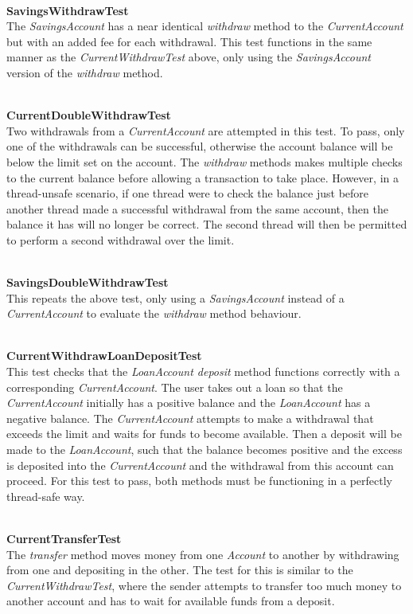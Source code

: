 \documentclass[a4paper,12pt]{article}
\begin{document}
\textbf{\\SavingsWithdrawTest}
\\The \textit{SavingsAccount} has a near identical \textit{withdraw} method to the \textit{CurrentAccount} but with an added fee for each withdrawal. This test functions in the same manner as the \textit{CurrentWithdrawTest} above, only using the \textit{SavingsAccount} version of the \textit{withdraw} method.

\textbf{\\CurrentDoubleWithdrawTest}
\\Two withdrawals from a \textit{CurrentAccount} are attempted in this test. To pass, only one of the withdrawals can be successful, otherwise the account balance will be below the limit set on the account. The \textit{withdraw} methods makes multiple checks to the current balance before allowing a transaction to take place. However, in a thread-unsafe scenario, if one thread were to check the balance just before another thread made a successful withdrawal from the same account, then the balance it has will no longer be correct. The second thread will then be permitted to perform a second withdrawal over the limit.    

\textbf{\\SavingsDoubleWithdrawTest}
\\This repeats the above test, only using a \textit{SavingsAccount} instead of a \textit{CurrentAccount} to evaluate the \textit{withdraw} method behaviour.

\textbf{\\CurrentWithdrawLoanDepositTest}
\\This test checks that the \textit{LoanAccount deposit} method functions correctly with a corresponding \textit{CurrentAccount}. The user takes out a loan so that the \textit{CurrentAccount} initially has a positive balance and the \textit{LoanAccount} has a negative balance. The \textit{CurrentAccount} attempts to make a withdrawal that exceeds the limit and waits for funds to become available. Then a deposit will be made to the \textit{LoanAccount}, such that the balance becomes positive and the excess is deposited into the \textit{CurrentAccount} and the withdrawal from this account can proceed. For this test to pass, both methods must be functioning in a perfectly thread-safe way.   

\textbf{\\CurrentTransferTest}
\\The \textit{transfer} method moves money from one \textit{Account} to another by withdrawing from one and depositing in the other. The test for this is similar to the \textit{CurrentWithdrawTest}, where the sender attempts to transfer too much money to another account and has to wait for available funds from a deposit.  
\end{document}
